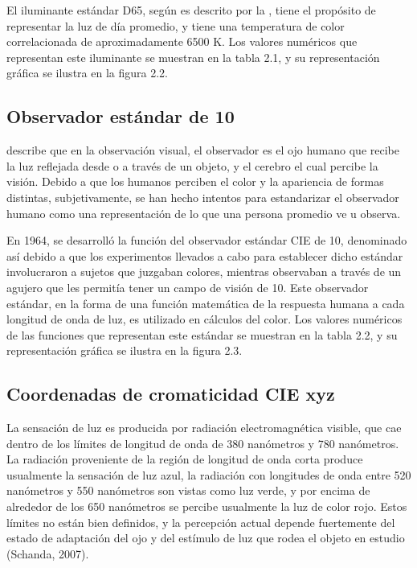 		El iluminante est\'{a}ndar D65, seg\'{u}n es descrito por la \cite{CIE}, tiene el prop\'{o}sito de representar la luz de d\'{i}a promedio, y tiene una temperatura de color correlacionada de aproximadamente 6500 K\degree. Los valores num\'{e}ricos que representan este iluminante se muestran en la tabla 2.1, y su representaci\'{o}n gr\'{a}fica se ilustra en la figura 2.2.

	\subsection{Observador est\'{a}ndar de 10\degree}
	
		\cite{HunterLab-applications} describe que en la observaci\'{o}n visual, el observador es el ojo humano que recibe la luz reflejada desde o a trav\'{e}s de un objeto, y el cerebro el cual percibe la visi\'{o}n. Debido a que los humanos perciben el color y la apariencia de formas distintas, subjetivamente, se han hecho intentos para estandarizar el observador humano como una representaci\'{o}n de lo que una persona promedio ve u observa.
		
		En 1964, se desarroll\'{o} la funci\'{o}n del observador est\'{a}ndar CIE de 10\degree, denominado as\'{i} debido a que los experimentos llevados a cabo para establecer dicho est\'{a}ndar involucraron a sujetos que juzgaban colores, mientras observaban a trav\'{e}s de un agujero que les permit\'{i}a tener un campo de visi\'{o}n de 10\degree. Este observador est\'{a}ndar, en la forma de una funci\'{o}n matem\'{a}tica de la respuesta humana a cada longitud de onda de luz, es utilizado en c\'{a}lculos del color. Los valores num\'{e}ricos de las funciones que representan este est\'{a}ndar se muestran en la tabla 2.2, y su representaci\'{o}n gr\'{a}fica se ilustra en la figura 2.3.
	
	\subsection{Coordenadas de cromaticidad CIE xyz}
	
		La sensaci\'{o}n de luz es producida por radiaci\'{o}n electromagn\'{e}tica visible, que cae dentro de los l\'{i}mites de longitud de onda de 380 nan\'{o}metros y 780 nan\'{o}metros. La radiaci\'{o}n proveniente de la regi\'{o}n de longitud de onda corta produce usualmente la sensaci\'{o}n de luz azul, la radiaci\'{o}n con longitudes de onda entre 520 nan\'{o}metros y 550 nan\'{o}metros son vistas como luz verde, y por encima de alrededor de los 650 nan\'{o}metros se percibe usualmente la luz de color rojo. Estos l\'{i}mites no est\'{a}n bien definidos, y la percepci\'{o}n actual depende fuertemente del estado de adaptaci\'{o}n del ojo y del est\'{i}mulo de luz que rodea el objeto en estudio (Schanda, 2007).
		
